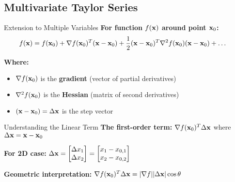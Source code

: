 \documentclass[usenames,dvipsnames]{beamer}
\begin{document}
  \subsection{Multivariate Taylor Series}

  \begin{frame}{Extension to Multiple Variables}
    \textbf{For function $f(\mathbf{x})$ around point $\mathbf{x}_0$:}
    \begin{align}
        f(\mathbf{x}) &= f(\mathbf{x}_0) + \nabla f(\mathbf{x}_0)^T(\mathbf{x}-\mathbf{x}_0) + \frac{1}{2}(\mathbf{x}-\mathbf{x}_0)^T\nabla^2 f(\mathbf{x}_0)(\mathbf{x}-\mathbf{x}_0) + \ldots
    \end{align}
    
    \pause
    \textbf{Where:}
    \begin{itemize}[<+->]
        \item $\nabla f(\mathbf{x}_0)$ is the \textbf{gradient} (vector of partial derivatives)
        \item $\nabla^2 f(\mathbf{x}_0)$ is the \textbf{Hessian} (matrix of second derivatives)
        \item $(\mathbf{x}-\mathbf{x}_0) = \Delta\mathbf{x}$ is the step vector
    \end{itemize}
  \end{frame}

  \begin{frame}{Understanding the Linear Term}
    \textbf{The first-order term:} $\nabla f(\mathbf{x}_0)^T \Delta\mathbf{x}$ where $\Delta\mathbf{x} = \mathbf{x} - \mathbf{x}_0$
    
    \pause
    \textbf{For 2D case:} $\Delta\mathbf{x} = \begin{bmatrix} \Delta x_1 \\ \Delta x_2 \end{bmatrix} = \begin{bmatrix} x_1 - x_{0,1} \\ x_2 - x_{0,2} \end{bmatrix}$
    
    \begin{center}
    \end{center}

    \textbf{Geometric interpretation:} $\nabla f(\mathbf{x}_0)^T \Delta\mathbf{x} = |\nabla f||\Delta\mathbf{x}|\cos\theta$
  \end{frame}
\end{document}
